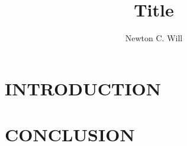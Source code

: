 \documentclass{gprscposter}
\title{Title}
\author{Newton C. Will}
\begin{document}
\begin{poster}

\section{\uppercase{Introduction}}

\section{\uppercase{Conclusion}}

\renewcommand\refname{\uppercase{References}}



\end{poster}
\end{document}

